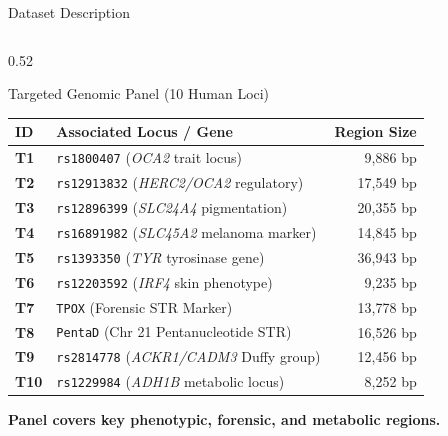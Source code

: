\documentclass[aspectratio=169, 10pt]{beamer}
\begin{document}
\begin{frame}{Dataset Description}
\begin{columns}[T]
        \begin{column}{0.52\textwidth}
            \begin{block}{Targeted Genomic Panel (10 Human Loci)}
                \tiny
                \begin{tabularx}{\textwidth}{l p{3.8cm} r}
                    \toprule
                    \textbf{ID} & \textbf{Associated Locus / Gene} & \textbf{Region Size} \\
                    \midrule
                    \textbf{T1} & \texttt{rs1800407} (\textit{OCA2} trait locus) & 9,886 bp \\
                    \textbf{T2} & \texttt{rs12913832} (\textit{HERC2/OCA2} regulatory) & 17,549 bp \\
                    \textbf{T3} & \texttt{rs12896399} (\textit{SLC24A4} pigmentation) & 20,355 bp \\
                    \textbf{T4} & \texttt{rs16891982} (\textit{SLC45A2} melanoma marker) & 14,845 bp \\
                    \textbf{T5} & \texttt{rs1393350} (\textit{TYR} tyrosinase gene) & 36,943 bp \\
                    \textbf{T6} & \texttt{rs12203592} (\textit{IRF4} skin phenotype) & 9,235 bp \\
                    \textbf{T7} & \texttt{TPOX} (Forensic STR Marker) & 13,778 bp \\
                    \textbf{T8} & \texttt{PentaD} (Chr 21 Pentanucleotide STR) & 16,526 bp \\
                    \textbf{T9} & \texttt{rs2814778} (\textit{ACKR1/CADM3} Duffy group) & 12,456 bp \\
                    \textbf{T10} & \texttt{rs1229984} (\textit{ADH1B} metabolic locus) & 8,252 bp \\
                    \bottomrule
                \end{tabularx}
            \end{block}
            \vspace{-0.1cm}
            \begin{center}
                \scriptsize \textcolor{successGreen}{\textbf{Panel covers key phenotypic, forensic, and metabolic regions.}}
            \end{center}
        \end{column}
    \end{columns}
\end{frame}
\end{document}
